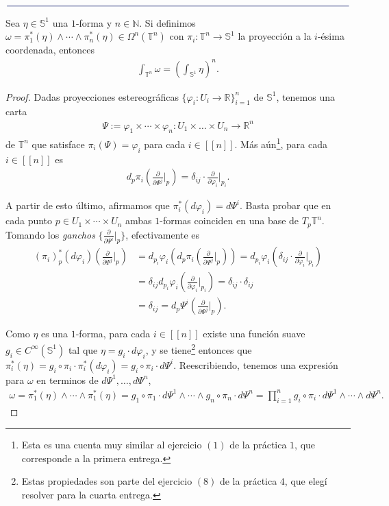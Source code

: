 \documentclass[11pt]{article}
\newcommand{\N}{\mathbb{N}}
\newcommand{\R}{\mathbb{R}}
\newcommand{\Ss}{\mathbb{S}}
\newcommand{\T}{\mathbb{T}}
\newcommand{\nat}[1]{[\![#1]\!]}
\newcommand{\paint}[1]{\color{color}{#1}}
\newcommand{\paintline}{\begin{center}
$\paint{
\rule{400pt}{0.5pt}
}$
\vspace{10pt}
\end{center}}
\newenvironment{lemma}[2][Lema]{\begin{trivlist}
\item[\hskip \labelsep \paint{{\bfseries #1}}\hskip \labelsep {\bfseries #2.}]}{\end{trivlist}}
\begin{document}
\paintline
\newpage
\begin{lemma}{4} Sea $\eta \in \Ss^1$ una $1$-forma y $n \in \N$. Si definimos $\omega = \pi^\ast_1(\eta) \wedge \cdots \wedge \pi^\ast_n(\eta) \in \Omega^n(\T^n)$ con $\pi_i : \T^n \to \Ss^1$ la proyección a la $i$-ésima coordenada, entonces
\begin{align*}
\int_{\T^n}\omega = \left(\int_{\Ss^1} \eta\right)^n.
\end{align*}
\end{lemma}
\begin{proof} Dadas proyecciones estereográficas $\{\varphi_i : U_i \to \R \}_{i=1}^n$ de $\Ss^1$, tenemos una carta
\begin{align*}
\Psi := \varphi_1 \times \cdots \times \varphi_n : U_1 \times \dots \times U_n \to \R^n
\end{align*}
de $\T^n$ que satisface $\pi_i(\Psi) = \varphi_i$ para cada $i \in \nat{n}$. Más aún\footnote{Esta es una cuenta muy similar al ejercicio $(1)$ de la práctica $1$, que corresponde a la primera entrega.}, para cada $i \in \nat{n}$ es
\begin{align*}
d_p\pi_i\left(\frac{\partial}{\partial \Psi^j}\Big|_p\right) = \delta_{ij} \cdot \frac{\partial}{\partial \varphi_i}\Big|_{p_i}.
\end{align*}

A partir de esto último, afirmamos que $\pi_i^*(d\varphi_i) = d\Psi^i$. Basta probar que en cada punto $p \in U_1 \times \cdots \times U_n$ ambas $1$-formas coinciden en una base de $T_p\T^n$. Tomando los \textit{ganchos} $\{\frac{\partial}{\partial \Psi^i}\big|_p\}$, efectivamente es
\begin{align*}
(\pi_i)_p^*(d\varphi_i)\left(\frac{\partial}{\partial \Psi^j}\Big|_p\right) &= d_{p_i}\varphi_i\left(d_p\pi_i\left(\frac{\partial}{\partial \Psi^j}\Big|_p\right) \right) = d_{p_i}\varphi_i\left(\delta_{ij} \cdot \frac{\partial}{\partial \varphi_i}\Big|_{p_i}\right)
\\&= \delta_{ij}d_{p_i}\varphi_i\left(\frac{\partial}{\partial \varphi_i}\Big|_{p_i}\right) = \delta_{ij} \cdot \delta_{ij}\\
&= \delta_{ij} = d_p\Psi^i\left(\frac{\partial}{\partial \Psi^j}\Big|_p\right).
\end{align*}

Como $\eta$ es una $1$-forma, para cada $i \in \nat{n}$ existe una función suave $g_i \in C^\infty(\Ss^1)$ tal que $\eta = g_i \cdot d\varphi_i$, y se tiene\footnote{Estas propiedades son parte del ejercicio $(8)$ de la práctica $4$, que elegí resolver para la cuarta entrega.} entonces que $\pi_i^\ast(\eta) = g_i \circ \pi_i \cdot \pi_i^*(d\varphi_i) = g_i \circ \pi_i \cdot d\Psi^i$. Reescribiendo, tenemos una expresión para $\omega$ en terminos de $d\Psi^1, \dots, d\Psi^n$,
\begin{align*}
\omega = \pi^\ast_1(\eta) \wedge \cdots \wedge \pi^\ast_1(\eta) = g_1 \circ \pi_1 \cdot d\Psi^1 \wedge \cdots \wedge g_n \circ \pi_n \cdot d\Psi^n = \prod_{i = 1}^{n}g_i \circ \pi_i \cdot d\Psi^1 \wedge \cdots \wedge d\Psi^n.
\end{align*}


\end{proof}
\end{document}
